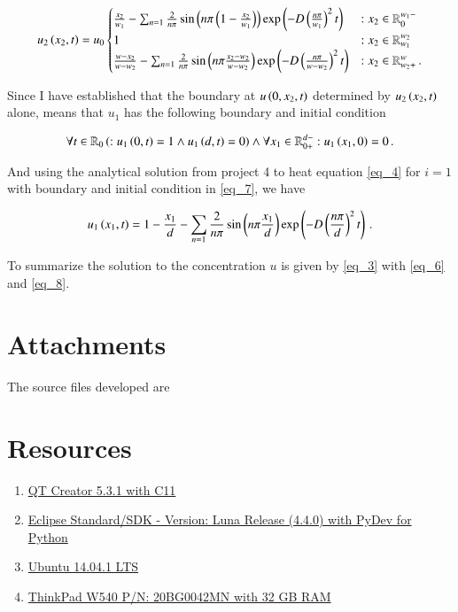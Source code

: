 \documentclass[11pt,english,a4paper]{article}
\begin{document}
\begin{flushleft}
\begin{align}
u_2\left({x_2,t}\right) = u_0 \begin{cases} \frac{x_2}{w_1} - \sum_{n=1} \frac{2}{n \pi} \sin\left({n\pi\left({1-\frac{x_2}{w_1}}\right)}\right)\exp\left({-D\left({\frac{n\pi}{w_1}}\right)^2 t}\right) &: x_2\in\mathbb{R}_0^{w_1-}\\ 1 &: x_2 \in\mathbb{R}_{w_1}^{w_2} \\  \frac{w-x_2}{w-w_2} - \sum_{n=1} \frac{2}{n \pi} \sin\left({n\pi\frac{x_2-w_2}{w-w_2}}\right)\exp\left({-D\left({\frac{n\pi}{w-w_2}}\right)^2 t}\right) & : x_2\in\mathbb{R}_{w_2+}^w \,.\end{cases}
\label{eq_6}
\end{align}

Since I have established that the boundary at $u\left({0,x_2,t}\right)$ determined by $u_2\left({x_2,t}\right)$ alone, means that $u_1$ has the following boundary and initial condition

\begin{align}
\forall t \in \mathbb{R}_0\left({: u_1\left({0,t}\right) = 1 \wedge u_1\left({d,t}\right) = 0}\right) \wedge  \forall x_1 \in \mathbb{R}_{0+}^{d-} : u_1\left({x_1,0}\right)=0 \,.  
\label{eq_7}
\end{align}

And using the analytical solution from project 4 to heat equation \eqref{eq_4} for $i=1$ with boundary and initial condition in \eqref{eq_7}, we have 

\begin{align}
u_1\left({x_1,t}\right) = 1-\frac{x_1}{d} - \sum_{n=1} \frac{2}{n \pi} \sin\left({n\pi\frac{x_1}{d}}\right)\exp\left({-D\left({\frac{n\pi}{d}}\right)^2 t}\right) \,.
\label{eq_8}
\end{align}

To summarize the solution to the concentration $u$ is given by \eqref{eq_3} with \eqref{eq_6} and \eqref{eq_8}. 


\section{Attachments}

The source files developed are


\section{Resources}

\begin{enumerate}
\item{\href{http://qt-project.org/downloads}{QT Creator 5.3.1 with C11}}
\item{\href{https://www.eclipse.org/downloads/}{Eclipse Standard/SDK  - Version: Luna Release (4.4.0) with PyDev for Python}}
\item{\href{http://www.ubuntu.com/download/desktop}{Ubuntu 14.04.1 LTS}}
\item{\href{http://shop.lenovo.com/no/en/laptops/thinkpad/w-series/w540/#tab-reseller}{ThinkPad W540 P/N: 20BG0042MN with 32 GB RAM}}
\end{enumerate}


\end{flushleft}
\end{document}
